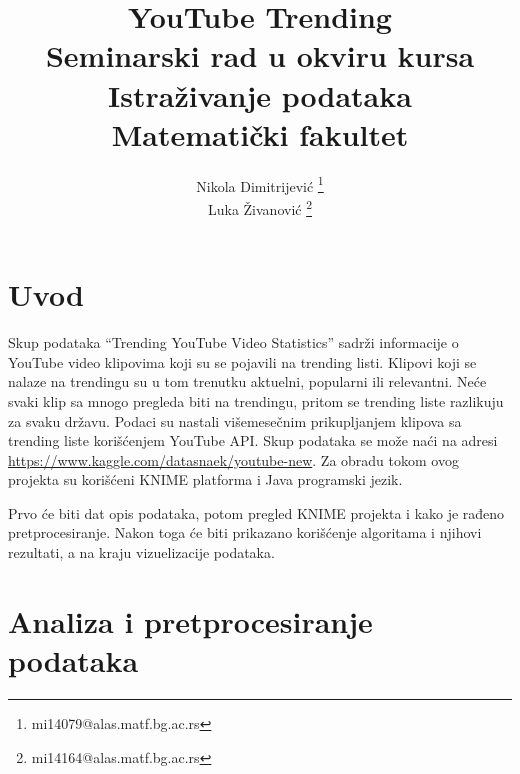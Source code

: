 \documentclass[a4paper]{article}
\theoremstyle{definition}
\begin{document}
\title{YouTube Trending\\ \small{Seminarski rad u okviru kursa\\Istraživanje podataka\\ Matematički fakultet}}

\author{Nikola Dimitrijević \footnote{mi14079@alas.matf.bg.ac.rs}\\
        Luka Živanović \footnote{mi14164@alas.matf.bg.ac.rs}\\
 }
\vspace*{-3cm}
    {\let\newpage\relax\maketitle}

\tableofcontents

\newpage



\section{Uvod}
\label{sec:uvod}
Skup podataka ``Trending YouTube Video Statistics'' sadrži informacije o YouTube video klipovima koji su se pojavili na trending listi.
Klipovi koji se nalaze na trendingu su u tom trenutku aktuelni, popularni ili relevantni. Neće svaki klip sa mnogo pregleda biti na trendingu,
 pritom se trending liste razlikuju za svaku državu. Podaci su nastali višemesečnim prikupljanjem klipova sa trending liste korišćenjem YouTube API.
Skup podataka se može naći na adresi \url{https://www.kaggle.com/datasnaek/youtube-new}.
Za obradu tokom ovog projekta su korišćeni KNIME platforma i Java programski jezik.

Prvo će biti dat opis podataka, potom pregled KNIME projekta i kako je rađeno pretprocesiranje. Nakon toga će biti prikazano korišćenje algoritama i njihovi rezultati, a na kraju
vizuelizacije podataka.
\section{Analiza i pretprocesiranje podataka}


\label{sec:analiza}
\end{document}
